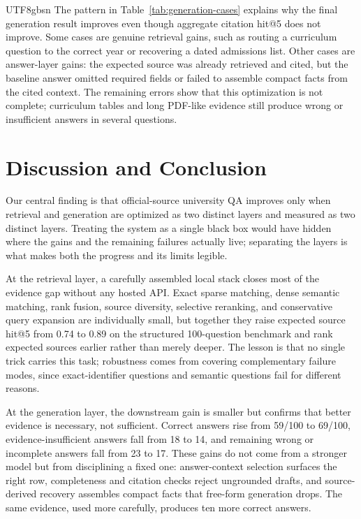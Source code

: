 \documentclass{article}
\begin{document}
\begin{CJK*}{UTF8}{gbsn}
The pattern in Table~\ref{tab:generation-cases} explains why the final generation result improves even though aggregate citation hit@5 does not improve. Some cases are genuine retrieval gains, such as routing a curriculum question to the correct year or recovering a dated admissions list. Other cases are answer-layer gains: the expected source was already retrieved and cited, but the baseline answer omitted required fields or failed to assemble compact facts from the cited context. The remaining errors show that this optimization is not complete; curriculum tables and long PDF-like evidence still produce wrong or insufficient answers in several questions.

\section{Discussion and Conclusion}

Our central finding is that official-source university QA improves only when retrieval and generation are optimized as two distinct layers and measured as two distinct layers. Treating the system as a single black box would have hidden where the gains and the remaining failures actually live; separating the layers is what makes both the progress and its limits legible.

At the retrieval layer, a carefully assembled local stack closes most of the evidence gap without any hosted API. Exact sparse matching, dense semantic matching, rank fusion, source diversity, selective reranking, and conservative query expansion are individually small, but together they raise expected source hit@5 from 0.74 to 0.89 on the structured 100-question benchmark and rank expected sources earlier rather than merely deeper. The lesson is that no single trick carries this task; robustness comes from covering complementary failure modes, since exact-identifier questions and semantic questions fail for different reasons.

At the generation layer, the downstream gain is smaller but confirms that better evidence is necessary, not sufficient. Correct answers rise from 59/100 to 69/100, evidence-insufficient answers fall from 18 to 14, and remaining wrong or incomplete answers fall from 23 to 17. These gains do not come from a stronger model but from disciplining a fixed one: answer-context selection surfaces the right row, completeness and citation checks reject ungrounded drafts, and source-derived recovery assembles compact facts that free-form generation drops. The same evidence, used more carefully, produces ten more correct answers.


\end{CJK*}
\end{document}
